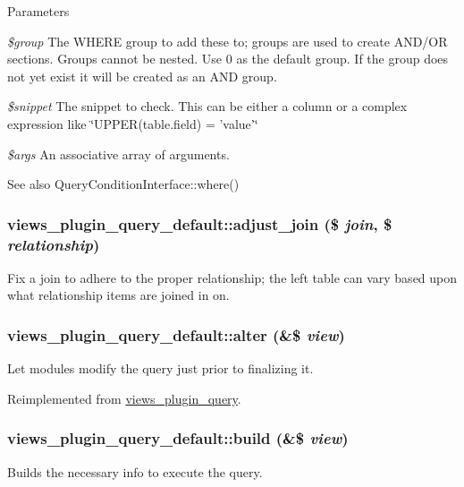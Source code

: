 \begin{DoxyParams}{Parameters}
\item[{\em \$group}]The WHERE group to add these to; groups are used to create AND/OR sections. Groups cannot be nested. Use 0 as the default group. If the group does not yet exist it will be created as an AND group. \item[{\em \$snippet}]The snippet to check. This can be either a column or a complex expression like \char`\"{}UPPER(table.field) = 'value'\char`\"{} \item[{\em \$args}]An associative array of arguments.\end{DoxyParams}
\begin{DoxySeeAlso}{See also}
QueryConditionInterface::where() 
\end{DoxySeeAlso}
\hypertarget{classviews__plugin__query__default_ac006f3847c96aa588b08b1072c36f939}{
\subsubsection[{adjust\_\-join}]{\setlength{\rightskip}{0pt plus 5cm}views\_\-plugin\_\-query\_\-default::adjust\_\-join (\$ {\em join}, \/  \$ {\em relationship})}}
\label{classviews__plugin__query__default_ac006f3847c96aa588b08b1072c36f939}
Fix a join to adhere to the proper relationship; the left table can vary based upon what relationship items are joined in on. \hypertarget{classviews__plugin__query__default_aeff774a83f61292070594afc26f7a3e6}{
\subsubsection[{alter}]{\setlength{\rightskip}{0pt plus 5cm}views\_\-plugin\_\-query\_\-default::alter (\&\$ {\em view})}}
\label{classviews__plugin__query__default_aeff774a83f61292070594afc26f7a3e6}
Let modules modify the query just prior to finalizing it. 

Reimplemented from \hyperlink{classviews__plugin__query_a19995bd24c67d383d8f6393b19a1ebfe}{views\_\-plugin\_\-query}.\hypertarget{classviews__plugin__query__default_af0d7dc2d4f1ac47d99b153a7734e4a96}{
\subsubsection[{build}]{\setlength{\rightskip}{0pt plus 5cm}views\_\-plugin\_\-query\_\-default::build (\&\$ {\em view})}}
\label{classviews__plugin__query__default_af0d7dc2d4f1ac47d99b153a7734e4a96}
Builds the necessary info to execute the query. 

